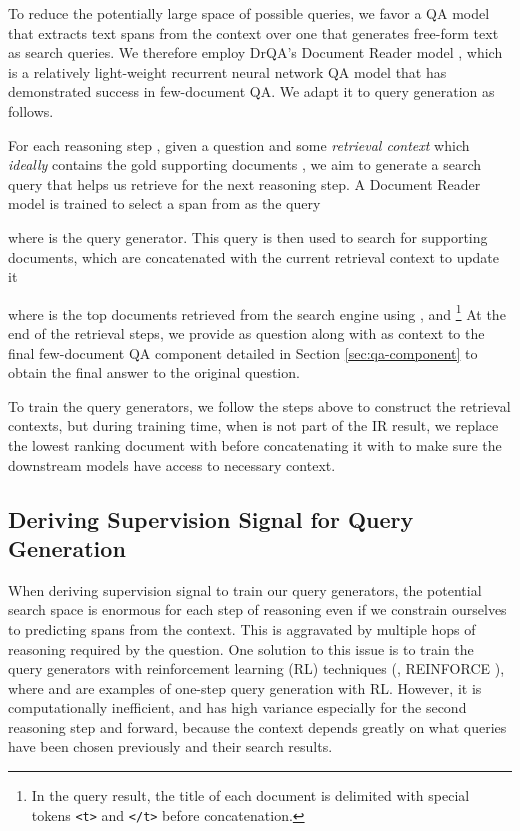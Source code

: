 To reduce the potentially large space of possible queries, we favor a QA model that extracts text spans from the context over one that generates free-form text as search queries.
We therefore employ DrQA's Document Reader model \cite{chen2017reading}, which is a relatively light-weight recurrent neural network QA model that has demonstrated success in few-document QA. We adapt it to query generation as follows.


For each reasoning step , given a question  and some \emph{retrieval context}  which \emph{ideally} contains the gold supporting documents , we aim to generate a search query  that helps us retrieve  for the next reasoning step.
A Document Reader model is trained to select a span from  as the query

where  is the query generator. This query is then used to search for supporting documents, which are concatenated with the current retrieval context to update it

where  is the top  documents retrieved from the search engine using , and \footnote{In the query result, the title of each document is delimited with special tokens \texttt{<t>} and \texttt{</t>} before concatenation.}
At the end of the retrieval steps, we provide  as question along with  as context to the final few-document QA component detailed in Section \ref{sec:qa-component} to obtain the final answer to the original question.

To train the query generators, we follow the steps above to construct the retrieval contexts, but during training time, when  is not part of the IR result, we replace the lowest ranking document with  before concatenating it with  to make sure the downstream models have access to necessary context.

\subsection{Deriving Supervision Signal for Query Generation}
When deriving supervision signal to train our query generators, the potential search space is enormous for each step of reasoning even if we constrain ourselves to predicting spans from the context.
This is aggravated by multiple hops of reasoning required by the question.
One solution to this issue is to train the query generators with reinforcement learning (RL) techniques (\eg, REINFORCE \cite{sutton2000policy}), where \cite{nogueira2017task} and \cite{buck2017ask} are examples of one-step query generation with RL. However, it is computationally inefficient, and has high variance especially for the second reasoning step and forward, because the context depends greatly on what queries have been chosen previously and their search results.

